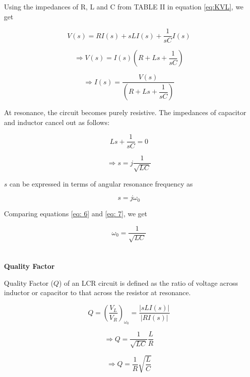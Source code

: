 \documentclass[journal,12pt,twocolumn]{IEEEtran}
\theoremstyle{remark}
\begin{document}
Using the impedances of R, L and C from TABLE II in equation \eqref{eq:KVL}, we get

\begin{equation}
    V(s) = R I(s) + sL I(s) + \dfrac{1}{sC} I(s)
\end{equation}

\begin{equation}
    \Rightarrow V(s) = I(s)\left(R + Ls + \dfrac{1}{sC}\right)
\end{equation}

\begin{equation}
    \Rightarrow I(s) = \dfrac{V(s)}{\left(R + Ls + \dfrac{1}{sC}\right)}
\end{equation}

At resonance, the circuit becomes purely resistive. The impedances of capacitor and inductor cancel out as follows:

\begin{equation}
    Ls + \dfrac{1}{sC} = 0
\end{equation}

\begin{equation}
    \Rightarrow s = j\dfrac{1}{\sqrt{LC}} \label{eq: 6}
\end{equation}

$s$ can be expressed in terms of angular resonance frequency as

\begin{equation}
    s = j\omega_0 \label{eq: 7}
\end{equation}

Comparing equations \eqref{eq: 6} and \eqref{eq: 7}, we get

\begin{equation}
    \omega_0 = \dfrac{1}{\sqrt{LC}}
\end{equation}\\
\\
\textbf{Quality Factor}

Quality Factor ($Q$) of an LCR circuit is defined as the ratio of voltage across inductor or capacitor to that across the resistor at resonance.

\begin{equation}
    Q = \left(\dfrac{V_L}{V_R}\right)_{\omega_0} = \dfrac{\lvert{sLI(s)}\rvert}{\lvert RI(s) \rvert}
\end{equation}

\begin{equation}
    \Rightarrow Q = \dfrac{1}{\sqrt{LC}}\dfrac{L}{R}
\end{equation}

\begin{equation}
    \Rightarrow Q = \dfrac{1}{R}\sqrt{\dfrac{L}{C}}
\end{equation}


\renewcommand{\thefigure}{\theenumi}
\renewcommand{\thetable}{\theenumi}
\end{document}
